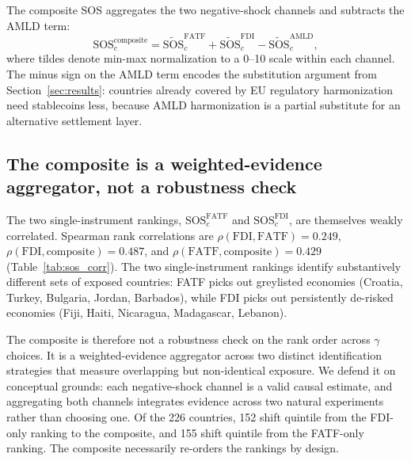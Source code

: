 The composite SOS aggregates the two negative-shock channels and subtracts the AMLD term:
\begin{equation}
\text{SOS}^{\text{composite}}_c = \widetilde{\text{SOS}}^{\text{FATF}}_c + \widetilde{\text{SOS}}^{\text{FDI}}_c - \widetilde{\text{SOS}}^{\text{AMLD}}_c,
\label{eq:sos_composite}
\end{equation}
where tildes denote min-max normalization to a 0--10 scale within each channel. The minus sign on the AMLD term encodes the substitution argument from Section~\ref{sec:results}: countries already covered by EU regulatory harmonization need stablecoins less, because AMLD harmonization is a partial substitute for an alternative settlement layer.

\subsection{The composite is a weighted-evidence aggregator, not a robustness check}
\label{subsec:sos_framing}

The two single-instrument rankings, $\text{SOS}^{\text{FATF}}_c$ and $\text{SOS}^{\text{FDI}}_c$, are themselves weakly correlated. Spearman rank correlations are $\rho(\text{FDI}, \text{FATF}) = 0.249$, $\rho(\text{FDI}, \text{composite}) = 0.487$, and $\rho(\text{FATF}, \text{composite}) = 0.429$ (Table~\ref{tab:sos_corr}). The two single-instrument rankings identify substantively different sets of exposed countries: FATF picks out greylisted economies (Croatia, Turkey, Bulgaria, Jordan, Barbados), while FDI picks out persistently de-risked economies (Fiji, Haiti, Nicaragua, Madagascar, Lebanon).

\begin{table}[htbp]
\centering
\caption{Spearman Rank Correlations Across SOS Variants}
\label{tab:sos_corr}
\begin{threeparttable}
\small

\begin{tablenotes}
\end{tablenotes}
\end{threeparttable}
\end{table}

The composite is therefore not a robustness check on the rank order across $\gamma$ choices. It is a weighted-evidence aggregator across two distinct identification strategies that measure overlapping but non-identical exposure. We defend it on conceptual grounds: each negative-shock channel is a valid causal estimate, and aggregating both channels integrates evidence across two natural experiments rather than choosing one. Of the 226 countries, 152 shift quintile from the FDI-only ranking to the composite, and 155 shift quintile from the FATF-only ranking. The composite necessarily re-orders the rankings by design.

